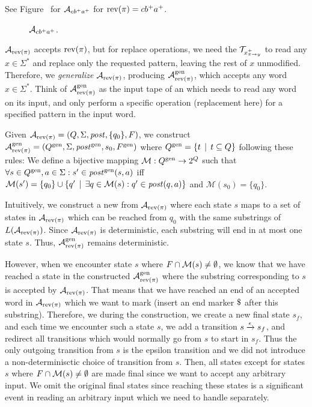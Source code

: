 See Figure~\cite{fig:end_marker_dfa} for \dfa $\mathcal{A}_{cb^+a^+}$ for $\text{rev(}\pi\text{)} = cb^+a^+$.

\begin{figure}[ht]
  \centering
  \caption{\dfa $\mathcal{A}_{cb^+a^+}$.}
  \label{fig:end_marker_dfa}
\end{figure}

$\mathcal{A}_{\text{rev(}\pi\text{)}}$ accepts $\text{rev(}\pi\text{)}$, but for replace operations, we need the $\mathcal{T}_{x^{+}_{\pi \rightarrow y}}$ to read any $x \in \Sigma^*$ and replace only the requested pattern, leaving the rest of $x$ unmodified.
Therefore, we \emph{generalize} $\mathcal{A}_{\text{rev(}\pi\text{)}}$, producing $\mathcal{A}^{\text{gen}}_{\text{rev(}\pi\text{)}}$, which accepts any word $x \in \Sigma^*$.
Think of $\mathcal{A}^{\text{gen}}_{\text{rev(}\pi\text{)}}$ as the input tape of an \nft which needs to read any word on its input, and only perform a specific operation (replacement here) for a specified pattern in the input word.

Given $\mathcal{A}_{\text{rev(}\pi\text{)}} = (Q, \Sigma, \mathit{post}, \{ q_0 \}, F)$, we construct $\mathcal{A}^{\text{gen}}_{\text{rev(}\pi\text{)}} = (Q^{\text{gen}}, \Sigma, \mathit{post}^{\text{gen}}, { s_0 }, F^{\text{gen}})$ where $Q^{\text{gen}} = \{ t \,\mid\, t \subseteq Q \}$ following these rules:\newline
We define a bijective mapping $\mathcal{M}: Q^{\text{gen}} \rightarrow 2^{Q }$ such that $\forall s \in Q^{\text{gen}}, a \in \Sigma: s' \in \mathit{post}^{\text{gen}}(s, a)$
iff $\mathcal{M}(s') = \{ q_0 \} \cup \{ q' \,\mid\, \exists q \in \mathcal{M}(s): q' \in \mathit{post}(q, a) \}$
and $\mathcal{M}(s_0) = \{ q_0 \}$.

Intuitively, we construct a new \dfa from $\mathcal{A}_{\text{rev(}\pi\text{)}}$ where each state $s$ maps to a set of states in $\mathcal{A}_{\text{rev(}\pi\text{)}}$ which can be reached from $q_0$ with the same substrings of $L(\mathcal{A}_{\text{rev(}\pi\text{)}})$.
Since $\mathcal{A}_{\text{rev(}\pi\text{)}}$ is deterministic, each substring will end in at most one state $s$.
Thus, $\mathcal{A}^{\text{gen}}_{\text{rev(}\pi\text{)}}$ remains deterministic.

However, when we encounter state $s$ where $F \cap \mathcal{M}(s) \neq \emptyset$, we know that we have reached a state in the constructed $\mathcal{A}^{\text{gen}}_{\text{rev(}\pi\text{)}}$ where the substring corresponding to $s$ is accepted by $\mathcal{A}_{\text{rev(}\pi\text{)}}$.
That means that we have reached an end of an accepted word in $\mathcal{A}_{\text{rev(}\pi\text{)}}$ which we want to mark (insert an end marker $\marker$ after this substring).
Therefore, we during the construction, we create a new final state $s_f$, and each time we encounter such a state $s$, we add a transition ${s} \xrightarrow{{\epsilon}} {s_f}$, and redirect all transitions which would normally go from $s$ to start in $s_f$.
Thus the only outgoing transition from $s$ is the epsilon transition and we did not introduce a non-determinisctic choice of transition from $s$.
Then, all states except for states $s$ where $F \cap \mathcal{M}(s) \neq \emptyset$ are made final since we want to accept any arbitrary input.
We omit the original final states since reaching these states is a significant event in reading an arbitrary input which we need to handle separately.

